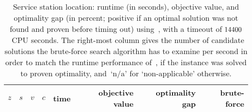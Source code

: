 \begin{table}[t]  %
  \centering
  \begin{tabular}{rrrrrrrr}  %
    $z$ & $s$ & $v$ & $c$ & time & objective value & optimality gap & brute-force \\
    \midrule
  \end{tabular}
  \caption{Service station location: runtime (in seconds), objective
    value, and optimality gap (in percent; positive if an optimal
    solution was not found and proven before timing out)
    using~\SolverMIP, with a timeout of $14400$~CPU seconds.
    The right-most column gives the number of candidate solutions the
    brute-force search algorithm has to examine per second in order to
    match the runtime performance of~\SolverMIP, if the instance was
    solved to proven optimality, and~`n/a' for `non-applicable'
    otherwise.
  }\label{tab:res:mip}
  
\end{table}

